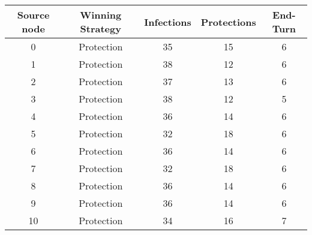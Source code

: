 \documentclass[results.tex]{subfiles}
\begin{document}
    \begin{center}
        \begin{tabular}{| c || c | c | c | c |}
            \hline
            {\bfseries Source node} & {\bfseries Winning Strategy} & {\bfseries Infections} & {\bfseries Protections}
            & {\bfseries End-Turn}
            \\  %
            \hline\hline
            0                       & Protection                   & 35                     & 15                      & 6                    \\
            \hline
            1                       & Protection                   & 38                     & 12                      & 6                    \\
            \hline
            2                       & Protection                   & 37                     & 13                      & 6                    \\
            \hline
            3                       & Protection                   & 38                     & 12                      & 5                    \\
            \hline
            4                       & Protection                   & 36                     & 14                      & 6                    \\
            \hline
            5                       & Protection                   & 32                     & 18                      & 6                    \\
            \hline
            6                       & Protection                   & 36                     & 14                      & 6                    \\
            \hline
            7                       & Protection                   & 32                     & 18                      & 6                    \\
            \hline
            8                       & Protection                   & 36                     & 14                      & 6                    \\
            \hline
            9                       & Protection                   & 36                     & 14                      & 6                    \\
            \hline
            10                      & Protection                   & 34                     & 16                      & 7                    \\

\end{tabular}
\end{center}
\end{document}
